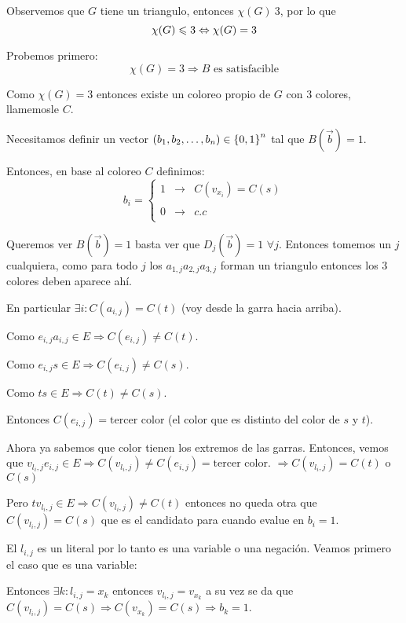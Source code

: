 \documentclass[12pt,a4paper]{article}
\begin{document}
Observemos que $G$ tiene un triangulo, entonces $\chi(G) \> 3$, por lo que
$$\chi(G) \leqslant 3 \Leftrightarrow \chi(G) = 3$$

Probemos primero:
$$\chi(G) = 3 \Rightarrow B \text{ es satisfacible}$$

Como $\chi (G) = 3$ entonces existe un coloreo propio de $G$ con $3$ colores, 
llamemosle $C$.
\medskip

Necesitamos definir un vector $(b_{1},b_{2},\ldots ,b_{n}) \in \left\lbrace 0,1 \right\rbrace^{n}$ 
tal que $B(\overrightarrow{b}) = 1$.
\medskip

Entonces, en base al coloreo $C$ definimos:
$$b_{i}= \left\{ \begin{array}{lcc}
    1 & \to & C(v_{x_{i}}) = C(s) \\
    \\ 0& \to & c.c\\
    \end{array}
    \right.$$

Queremos ver $B(\overrightarrow{b}) = 1$ basta ver que $D_{j}(\overrightarrow{b}) = 1\,\, \forall j$. 
Entonces tomemos un $j$ cualquiera, como para todo $j$ los $a_{1,j}a_{2,j}a_{3,j}$ 
forman un triangulo entonces los $3$ colores deben aparece ahí.
\medskip

En particular $\exists i: C(a_{i,j}) = C(t)$ (voy desde la garra hacia arriba). 
\medskip

Como $e_{i,j}a_{i,j} \in E \Rightarrow C(e_{i,j}) \neq C(t)$.
\medskip

Como $e_{i,j}s \in E \Rightarrow C(e_{i,j}) \neq C(s)$.
\medskip

Como $ts \in E \Rightarrow C(t) \neq C(s)$.
\medskip

Entonces $C(e_{i,j}) = \text{tercer color}$ (el color que es distinto del color de 
$s$ y $t$).
\medskip

Ahora ya sabemos que color tienen los extremos de las garras. Entonces, vemos que
$v_{l_{i},j}e_{i,j} \in E \Rightarrow C(v_{l_{i},j}) \neq C(e_{i,j}) = \text{tercer color}$.
$\Rightarrow C(v_{l_{i},j}) = C(t)$ o $C(s)$
\medskip

Pero $tv_{l_{i},j} \in E \Rightarrow C(v_{l_{i},j})\neq C(t)$ entonces no queda 
otra que $C(v_{l_{i},j}) = C(s)$ que es el candidato para cuando evalue en $b_{i}=1$.
\medskip

El $l_{i,j}$ es un literal por lo tanto es una variable o una negación. Veamos 
primero el caso que es una variable:
\medskip

Entonces $\exists k : l_{i,j} = x_{k}$ entonces $v_{l_{i},j} = v_{x_{k}}$ a su vez 
se da que $C(v_{l_{i},j}) = C(s) \Rightarrow C(v_{x_{k}}) = C(s) \Rightarrow b_{k} = 1$.
\medskip
\end{document}
